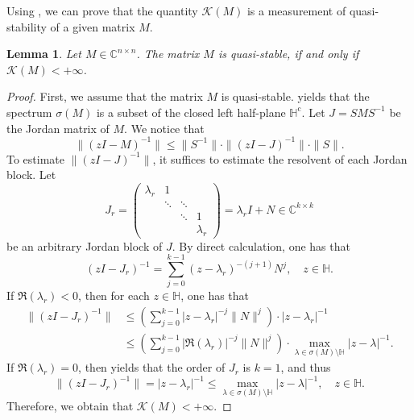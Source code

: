 \documentclass{article}
\theoremstyle{plain}%
\newtheorem{lemma}{Lemma}%
\theoremstyle{definition}%
\theoremstyle{remark}%
\newcommand{\bC}{\mathbb{C}}
\newcommand{\bH}{\mathbb{H}}
\newcommand{\cK}{\mathcal{K}}
\newcommand{\rc}{\mathrm{c}}
\newcommand{\+}[1]{{\bm{#1}}}
\newcommand{\norm}[1]{\|{#1}\|}
\begin{document}
Using , we can prove that the quantity 
$\cK(M)$ is a measurement of quasi-stability of a 
given matrix $M$.
\begin{lemma}\label{lemma:QS_KM}
  Let $M \in \bC^{n \times n}$. The matrix $M$ is quasi-stable, if 
  and only if $\cK(M) < + \infty$.
\end{lemma}
\begin{proof}
  First, we assume that the matrix $M$ is quasi-stable. 
   yields that the spectrum $\sigma(M)$ is 
  a subset of the closed left half-plane $\bH^\rc$.
  Let $J = S M S^{-1}$ be the Jordan matrix of $M$. We notice that 
  \begin{displaymath}
    \norm{(z I - M)^{-1}} \le \norm{S^{-1}} \cdot 
    \norm{(z I - J)^{-1}} \cdot \norm{S}.
  \end{displaymath}
  To estimate $\norm{(z I - J)^{-1}}$, it suffices to estimate the 
  resolvent of each Jordan block. Let 
  \begin{displaymath}
    J_r = \begin{pmatrix}
      \lambda_r & 1 & & \\
      & \ddots & \ddots & \\
      & & \ddots & 1 \\
      & & & \lambda_r
    \end{pmatrix} = \lambda_r I + N \in \bC^{k \times k}
  \end{displaymath}
  be an arbitrary Jordan block of $J$.
  By direct calculation, one has that 
  \begin{equation}\label{equ:resolventJr}
    (z I - J_r)^{-1} = \sum_{j = 0}^{k - 1} 
      (z - \lambda_r)^{-(j + 1)} N^j, \quad z \in \bH.
  \end{equation}
  If $\Re(\lambda_r) < 0$, then for each $z \in \bH$, one has that 
  \begin{displaymath}
    \begin{aligned}
      \norm{(z I - J_r)^{-1}} & \le \left( 
        \sum_{j = 0}^{k - 1} |z - \lambda_r|^{-j} \norm{N}^j \right)
        \cdot |z - \lambda_r|^{-1} \\
      & \le \left( \sum_{j = 0}^{k - 1} |\Re(\lambda_r)|^{-j} 
        \norm{N}^j \right) \cdot 
        \max_{\lambda \in \sigma(M) \setminus \bH} |z - \lambda|^{-1}.
    \end{aligned}
  \end{displaymath}
  If $\Re(\lambda_r) = 0$, then  yields that 
  the order of $J_r$ is $k = 1$, and thus 
  \begin{displaymath}
    \norm{(z I - J_r)^{-1}} = |z - \lambda_r|^{-1} \le 
    \max_{\lambda \in \sigma(M) \setminus \bH} |z - \lambda|^{-1},
    \quad z \in \bH.
  \end{displaymath}
  Therefore, we obtain that $\cK(M) < + \infty$.


\end{proof}
\end{document}

